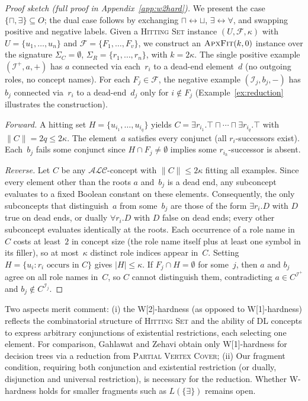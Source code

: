 \documentclass[accepted]{uai2026} %
\theoremstyle{definition}
\theoremstyle{remark}
\newcommand{\AF}{\textsc{ApxFit}}
\begin{document}
\begin{proof}[Proof sketch
  (full proof in Appendix~\ref{app:w2hard})]
  We present the case
  $\{\sqcap, \exists\} \subseteq O$; the dual case follows by
  exchanging $\sqcap \leftrightarrow \sqcup$,
  $\exists \leftrightarrow \forall$, and swapping positive and
  negative labels. Given a \textsc{Hitting Set} instance
  $(U, \mathcal{F}, \kappa)$ with $U = \{u_1, \ldots, u_n\}$ and
  $\mathcal{F} = \{F_1, \ldots, F_v\}$, we construct an
  $\AF(k, 0)$ instance over the signature
  $\Sigma_C = \emptyset$,
  $\Sigma_R = \{r_1, \ldots, r_n\}$, with $k = 2\kappa$.
  The single positive example $(\mathcal{I}^+, a, +)$ has $a$
  connected via each~$r_i$ to a dead-end element~$d$ (no outgoing
  roles, no concept names). For each $F_j \in \mathcal{F}$, the
  negative example $(\mathcal{I}_j, b_j, -)$ has $b_j$ connected
  via~$r_i$ to a dead-end~$d_j$ only for $i \notin F_j$
  (Example~\ref{ex:reduction} illustrates the
  construction).

  \emph{Forward.} A hitting set
  $H = \{u_{i_1}, \ldots, u_{i_q}\}$ yields
  $C = \exists r_{i_1}.\top \sqcap \cdots \sqcap
  \exists r_{i_q}.\top$ with $\|C\| = 2q \leq 2\kappa$.
  The element~$a$ satisfies every conjunct (all $r_i$-successors
  exist). Each~$b_j$ fails some conjunct since
  $H \cap F_j \neq \emptyset$ implies some $r_{i_h}$-successor
  is absent.

  \emph{Reverse.}
  Let $C$ be any $\mathcal{ALC}$-concept with $\|C\| \leq 2\kappa$
  fitting all examples. Since every element
  other than the roots $a$ and~$b_j$ is a dead end,
  any subconcept evaluates to a fixed Boolean constant on these
  elements. Consequently, the only subconcepts that
  distinguish~$a$ from some~$b_j$ are those of the form
  $\exists r_i.D$ with $D$
  true on dead ends, or dually $\forall r_i.D$ with $D$ false on
  dead ends; every other subconcept evaluates identically at the
  roots. Each occurrence of a role name in~$C$ costs at
  least~$2$ in concept size (the role name itself plus at least
  one symbol in its filler), so at most~$\kappa$ distinct role
  indices appear in~$C$. Setting
  $H = \{u_i : r_i \text{ occurs in } C\}$ gives
  $|H| \leq \kappa$. If $F_j \cap H = \emptyset$ for some~$j$,
  then $a$ and $b_j$ agree on all role names in~$C$, so $C$
cannot distinguish them, contradicting
$a \in C^{\mathcal{I}^+}$ and
  $b_j \notin C^{\mathcal{I}_j}$.\qedhere
\end{proof}

Two aspects merit comment: (i) the W[2]-hardness (as opposed to W[1]-hardness) reflects
the combinatorial structure of \textsc{Hitting Set} and the
ability of DL concepts to express arbitrary conjunctions of
existential restrictions, each selecting one element.
For comparison, Gahlawat and Zehavi obtain only
W[1]-hardness for decision trees via a reduction from
\textsc{Partial Vertex Cover}; (ii) Our fragment condition, requiring both
conjunction and
existential restriction (or dually, disjunction and universal
restriction), is necessary for the reduction. Whether
W-hardness holds for smaller fragments such as
$L(\{\exists\})$ remains open.
\end{document}
